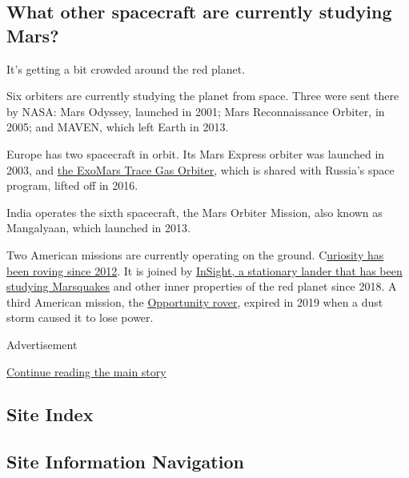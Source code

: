 \hypertarget{what-other-spacecraft-are-currently-studying-mars}{%
\subsection{What other spacecraft are currently studying
Mars?}\label{what-other-spacecraft-are-currently-studying-mars}}

It's getting a bit crowded around the red planet.

Six orbiters are currently studying the planet from space. Three were
sent there by NASA: Mars Odyssey, launched in 2001; Mars Reconnaissance
Orbiter, in 2005; and MAVEN, which left Earth in 2013.

Europe has two spacecraft in orbit. Its Mars Express orbiter was
launched in 2003, and
\href{https://www.nytimes3xbfgragh.onion/2019/04/10/science/mars-methane-life.html}{the
ExoMars Trace Gas Orbiter}, which is shared with Russia's space program,
lifted off in 2016.

India operates the sixth spacecraft, the Mars Orbiter Mission, also
known as Mangalyaan, which launched in 2013.

Two American missions are currently operating on the ground.
C\href{https://www.nytimes3xbfgragh.onion/2019/06/22/science/nasa-mars-rover-life.html}{uriosity
has been roving since 2012}. It is joined by
\href{https://www.nytimes3xbfgragh.onion/interactive/2018/05/01/science/mars-nasa-insight-ar-3d-ul.html}{InSight,
a stationary lander that has been studying Marsquakes} and other inner
properties of the red planet since 2018. A third American mission, the
\href{https://www.nytimes3xbfgragh.onion/2019/02/13/science/mars-opportunity-rover-dead.html}{Opportunity
rover}, expired in 2019 when a dust storm caused it to lose power.

Advertisement

\protect\hyperlink{after-bottom}{Continue reading the main story}

\hypertarget{site-index}{%
\subsection{Site Index}\label{site-index}}

\hypertarget{site-information-navigation}{%
\subsection{Site Information
Navigation}\label{site-information-navigation}}

